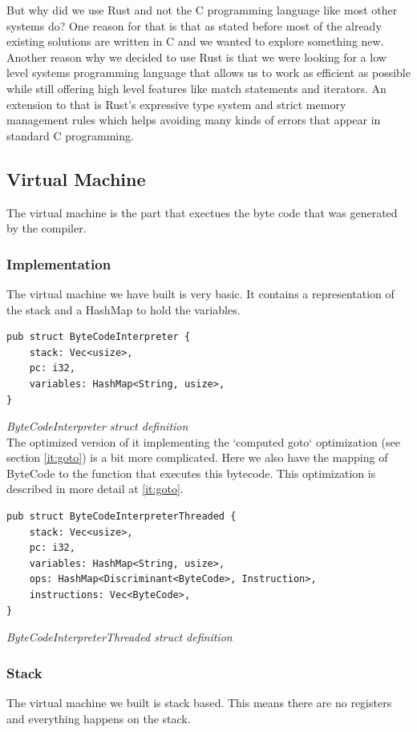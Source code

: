 \documentclass{article}
\begin{document}
But why did we use Rust and not the C programming language like most other
systems do?
One reason for that is that as stated before most of the already existing
solutions are written in C and we wanted to explore something new.
Another reason why we decided to use Rust is that we were looking for a low level
systems programming language that allows us to work as efficient as possible
while still offering high level features like match statements and iterators.
An extension to that is Rust's expressive type system and strict memory
management rules which helps avoiding many kinds of errors that appear in 
standard C programming.

\subsection{Virtual Machine}
The virtual machine is the part that exectues the byte code that was generated
by the compiler.

\subsubsection{Implementation}
The virtual machine we have built is very basic. It contains a representation
of the stack and a HashMap to hold the variables.

\begin{verbatim}
pub struct ByteCodeInterpreter {
    stack: Vec<usize>,
    pc: i32,
    variables: HashMap<String, usize>,
}
\end{verbatim}
\textit{ByteCodeInterpreter struct definition} \\

The optimized version of it implementing the `computed goto` optimization (see
section \ref{it:goto}) is a bit more complicated. Here we also have the mapping
of ByteCode to the function that executes this bytecode. This optimization is 
described in more detail at \ref{it:goto}.

\begin{verbatim}
pub struct ByteCodeInterpreterThreaded {
    stack: Vec<usize>,
    pc: i32,
    variables: HashMap<String, usize>,
    ops: HashMap<Discriminant<ByteCode>, Instruction>,
    instructions: Vec<ByteCode>,
}
\end{verbatim}
\textit{ByteCodeInterpreterThreaded struct definition} \\


\subsubsection{Stack}
The virtual machine we built is stack based. This means there are no registers
and everything happens on the stack.
\end{document}
